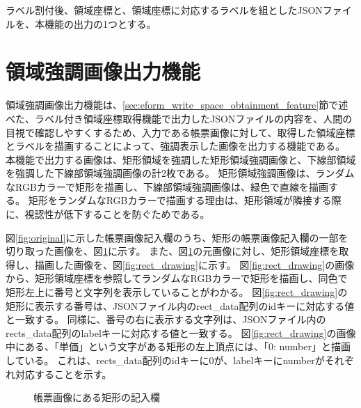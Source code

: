 ラベル割付後、領域座標と、領域座標に対応するラベルを組としたJSONファイルを、本機能の出力の1つとする。


\section{領域強調画像出力機能}\label{sec:highlighted_area_image_output}
領域強調画像出力機能は、\ref{sec:eform_write_space_obtainment_feature}節で述べた、ラベル付き領域座標取得機能で出力したJSONファイルの内容を、人間の目視で確認しやすくするため、入力である帳票画像に対して、取得した領域座標とラベルを描画することによって、強調表示した画像を出力する機能である。
本機能で出力する画像は、矩形領域を強調した矩形領域強調画像と、下線部領域を強調した下線部領域強調画像の計2枚である。
矩形領域強調画像は、ランダムなRGBカラーで矩形を描画し、下線部領域強調画像は、緑色で直線を描画する。
矩形をランダムなRGBカラーで描画する理由は、矩形領域が隣接する際に、視認性が低下することを防ぐためである。

図\ref{fig:original}に示した帳票画像記入欄のうち、矩形の帳票画像記入欄の一部を切り取った画像を、図\ref{fig:rect_original}に示す。
また、図\ref{fig:rect_original}の元画像に対し、矩形領域座標を取得し、描画した画像を、図\ref{fig:rect_drawing}に示す。
図\ref{fig:rect_drawing}の画像から、矩形領域座標を参照してランダムなRGBカラーで矩形を描画し、同色で矩形左上に番号と文字列を表示していることがわかる。
図\ref{fig:rect_drawing}の矩形に表示する番号は、JSONファイル内のrect\_data配列のidキーに対応する値と一致する。
同様に、番号の右に表示する文字列は、JSONファイル内のrects\_data配列のlabelキーに対応する値と一致する。
図\ref{fig:rect_drawing}の画像中にある、「単価」という文字がある矩形の左上頂点には、「0: number」と描画している。
これは、rects\_data配列のidキーに0が、labelキーにnumberがそれぞれ対応することを示す。

\begin{figure}[t]
    \begin{center}
        \caption{帳票画像にある矩形の記入欄}
        \label{fig:rect_original}
    \end{center}
\end{figure}

